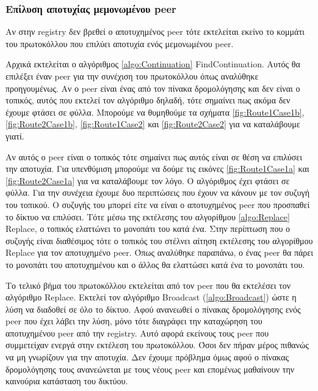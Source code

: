 \subsubsection{Επίλυση αποτυχίας μεμονωμένου peer}

Αν στην registry δεν βρεθεί ο αποτυχημένος peer τότε εκτελείται εκείνο το 
κομμάτι του πρωτοκόλλου που επιλύει αποτυχία ενός μεμονωμένου peer.

Αρχικά εκτελείται ο αλγόριθμος \ref{algo:Continuation} FindContinuation. 
Αυτός θα επιλέξει έναν peer για την συνέχιση του πρωτοκόλλου όπως αναλύθηκε 
προηγουμένως. Αν ο peer είναι ένας από τον πίνακα δρομολόγησης και δεν είναι 
ο τοπικός, αυτός που εκτελεί τον αλγόριθμο δηλαδή, τότε σημαίνει πως ακόμα δεν 
έχουμε φτάσει σε φύλλα. Μπορούμε να θυμηθούμε τα σχήματα 
\ref{fig:Route1Case1b}, \ref{fig:Route2Case1b}, \ref{fig:Route1Case2} 
και \ref{fig:Route2Case2} για να καταλάβουμε γιατί.

Αν αυτός ο peer είναι ο τοπικός τότε σημαίνει πως αυτός είναι σε θέση να 
επιλύσει την αποτυχία. Για υπενθύμιση μπορούμε να δούμε τις εικόνες 
\ref{fig:Route1Case1a} και \ref{fig:Route2Case1a} για να καταλάβουμε τον 
λόγο. Ο αλγόριθμος έχει φτάσει σε φύλλα. Για την συνέχεια έχουμε δυο 
περιπτώσεις που έχουν να κάνουν με τον συζυγή του τοπικού. Ο συζυγής του 
μπορεί είτε να είναι ο αποτυχημένος peer που προσπαθεί το δίκτυο να επιλύσει. 
Τότε μέσω της εκτέλεσης του αλγορίθμου \ref{algo:Replace} Replace, ο 
τοπικός ελαττώνει το μονοπάτι του κατά ένα. Στην περίπτωση που ο συζυγής 
είναι διαθέσιμος τότε ο τοπικός του στέλνει αίτηση εκτέλεσης του αλγορίθμου 
Replace για τον αποτυχημένο peer. Όπως αναλύθηκε παραπάνω, ο ένας peer θα 
πάρει το μονοπάτι του αποτυχημένου και ο άλλος θα ελαττώσει κατά ένα το 
μονοπάτι του.

Το τελικό βήμα του πρωτοκόλλου εκτελείται από τον peer που θα εκτελέσει τον 
αλγόριθμο Replace. Εκτελεί τον αλγόριθμο Broadcast (\ref{algo:Broadcast}) 
ώστε η λύση να διαδοθεί σε όλο το δίκτυο. Αφού ανανεωθεί ο 
πίνακας δρομολόγησης ενός peer που έχει λάβει την λύση, μόνο τότε διαγράφει 
την καταχώρηση του αποτυχημένου peer από την registry. Αυτό αφορά εκείνους 
τους peer που συμμετείχαν ενεργά στην εκτέλεση του πρωτοκόλλου. Όσοι δεν 
πήραν μέρος πιθανώς να μη γνωρίζουν για την αποτυχία. Δεν έχουμε πρόβλημα 
όμως αφού ο πίνακας δρομολόγησης τους ανανεώνεται με τους νέους peer και 
επομένως μαθαίνουν την καινούρια κατάσταση του δικτύου.


